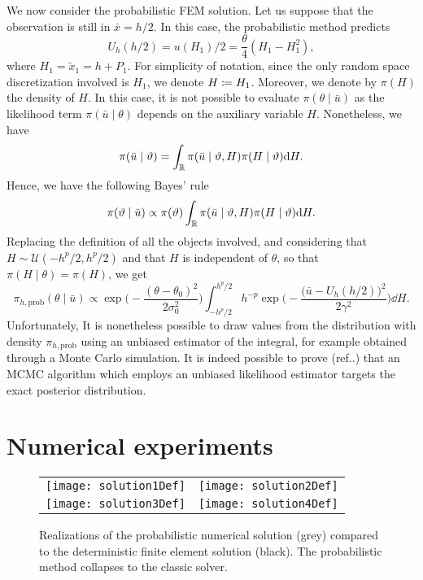 \documentclass[10pt]{article}
\begin{document}
We now consider the probabilistic FEM solution. Let us suppose that the observation is still in $\bar x = h / 2$. In this case, the probabilistic method predicts
\begin{equation}
	U_h(h/2) = u(H_1) / 2 = \frac{\theta}{4}(H_1 - H_1^2),
\end{equation}
where $H_1 = \tilde x_1 = h + P_1$. For simplicity of notation, since the only random space discretization involved is $H_1$, we denote $H \coloneqq H_1$. Moreover, we denote by $\pi(H)$ the density of $H$. In this case, it is not possible to evaluate $\pi(\theta \mid \bar u)$ as the likelihood term $\pi(\bar u \mid \theta)$ depends on the auxiliary variable $H$. Nonetheless, we have
\begin{equation}
	\pi(\bar u \mid \vartheta) = \int_{\mathbb{R}} \pi(\bar u \mid \vartheta, H) \pi(H \mid \vartheta) \mathrm{d} H.
\end{equation}
Hence, we have the following Bayes' rule
\begin{equation}
	\pi(\vartheta \mid \bar u) \propto \pi(\vartheta) \int_{\mathbb{R}} \pi(\bar u \mid \vartheta, H) \pi(H \mid \vartheta) \mathrm{d} H.
\end{equation}
Replacing the definition of all the objects involved, and considering that $H \sim \mathcal{U}(-h^p/2, h^p/2)$ and that $H$ is independent of $\theta$, so that $\pi(H \mid \theta) = \pi(H)$, we get
\begin{equation}
	\pi_{h,\mathrm{prob}}(\theta \mid \bar u) \propto \exp\Big(-\frac{(\theta-\theta_0)^2}{2\sigma_0^2}\Big)\int_{-h^p/2}^{h^p/2} h^{-p}\exp\Big(-\frac{\big(\bar u - U_h(h/2)\big)^2}{2\gamma^2}\Big) \dd H.
\end{equation}
Unfortunately,  It is nonetheless possible to draw values from the distribution with density $\pi_{h, \mathrm{prob}}$ using an unbiased estimator of the integral, for example obtained through a Monte Carlo simulation. It is indeed possible to prove (ref..) that an MCMC algorithm which employs an unbiased likelihood estimator targets the exact posterior distribution. 

\section{Numerical experiments} 

\begin{figure}[t!]
	\begin{center}
		\begin{tabular}{cc}%
			\texttt{[image: solution1Def]} & \texttt{[image: solution2Def]} \\
			\texttt{[image: solution3Def]} & \texttt{[image: solution4Def]} \\
		\end{tabular}
	\end{center}
	\caption{Realizations of the probabilistic numerical solution (grey) compared to the deterministic finite element solution (black). The probabilistic method collapses to the classic solver.}
	\label{fig:ResultsCollapse}
\end{figure}
\end{document}
